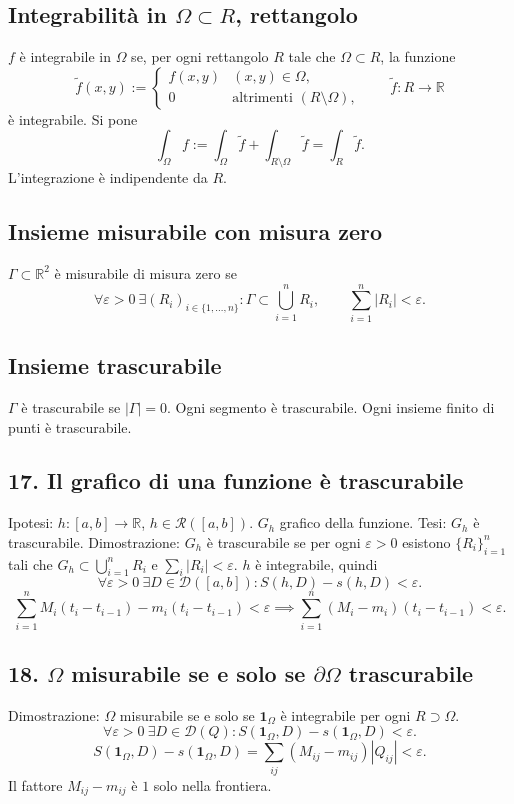 \documentclass[11pt,a4paper]{article}
\newcommand{\R}{\mathbb R}\newcommand{\N}{\mathbb N}\newcommand{\pagina}[1]{\clearpage}
\begin{document}
\subsection*{Integrabilità in $\Omega\subset R$, rettangolo}
$f$ è integrabile in $\Omega$ se, per ogni rettangolo $R$ tale che $\Omega\subset R$, la funzione
\[\widetilde f(x,y):=\begin{cases}f(x,y)&(x,y)\in\Omega,\\0&\text{altrimenti }(R\setminus\Omega),\end{cases}\qquad\widetilde f:R\to\R\]
è integrabile. Si pone
\[\int_\Omega f:=\int_\Omega\widetilde f+\int_{R\setminus\Omega}\widetilde f=\int_R\widetilde f.\]
L'integrazione è indipendente da $R$.
\subsection*{Insieme misurabile con misura zero}
$\Gamma\subset\R^2$ è misurabile di misura zero se
\[\forall\varepsilon>0\ \exists(R_i)_{i\in\{1,\ldots,n\}}:\Gamma\subset\bigcup_{i=1}^nR_i,\qquad\sum_{i=1}^n|R_i|<\varepsilon.\]
\subsection*{Insieme trascurabile}
$\Gamma$ è trascurabile se $|\Gamma|=0$. Ogni segmento è trascurabile. Ogni insieme finito di punti è trascurabile.
\subsection*{17. Il grafico di una funzione è trascurabile}
Ipotesi: $h:[a,b]\to\R$, $h\in\mathcal R([a,b])$. $G_h$ grafico della funzione.
\pagina{39}
Tesi: $G_h$ è trascurabile. Dimostrazione: $G_h$ è trascurabile se per ogni $\varepsilon>0$ esistono $\{R_i\}_{i=1}^n$ tali che $G_h\subset\bigcup_{i=1}^nR_i$ e $\sum_i|R_i|<\varepsilon$. $h$ è integrabile, quindi
\[\forall\varepsilon>0\ \exists D\in\mathcal D([a,b]):S(h,D)-s(h,D)<\varepsilon.\]
\[\sum_{i=1}^nM_i(t_i-t_{i-1})-m_i(t_i-t_{i-1})<\varepsilon
\implies\sum_{i=1}^n(M_i-m_i)(t_i-t_{i-1})<\varepsilon.\]
\subsection*{18. $\Omega$ misurabile se e solo se $\partial\Omega$ trascurabile}
Dimostrazione: $\Omega$ misurabile se e solo se $\mathbf1_\Omega$ è integrabile per ogni $R\supset\Omega$.
\[\forall\varepsilon>0\ \exists D\in\mathcal D(Q):S(\mathbf1_\Omega,D)-s(\mathbf1_\Omega,D)<\varepsilon.\]
\[S(\mathbf1_\Omega,D)-s(\mathbf1_\Omega,D)=\sum_{ij}(M_{ij}-m_{ij})|Q_{ij}|<\varepsilon.\]
Il fattore $M_{ij}-m_{ij}$ è $1$ solo nella frontiera.
\end{document}
